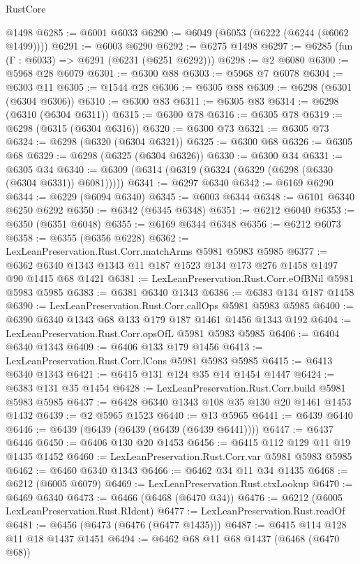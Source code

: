 \begin{lexlean}{RustCore}
\begin{coremodule}
{\begin{coremodule}
{{{{{{{{{{{{{{{{{{{{{{{{{{{{{{{{{{{{{{{{{{{{{{{    @1498
@6285 := @6001 @6033
@6290 := @6049 (@6053 (@6222 (@6244 (@6062 @1499))))
@6291 := @6003 @6290
@6292 := @6275 @1498
@6297 := @6285 (fun (Γ : @6033) => @6291 (@6231 (@6251 @6292)))
@6298 := @2 @6080
@6300 := @5968 @28 @6079
@6301 := @6300 @88
@6303 := @5968 @7 @6078
@6304 := @6303 @11
@6305 := @1544 @28
@6306 := @6305 @88
@6309 := @6298 (@6301 (@6304 @6306))
@6310 := @6300 @83
@6311 := @6305 @83
@6314 := @6298 (@6310 (@6304 @6311))
@6315 := @6300 @78
@6316 := @6305 @78
@6319 := @6298 (@6315 (@6304 @6316))
@6320 := @6300 @73
@6321 := @6305 @73
@6324 := @6298 (@6320 (@6304 @6321))
@6325 := @6300 @68
@6326 := @6305 @68
@6329 := @6298 (@6325 (@6304 @6326))
@6330 := @6300 @34
@6331 := @6305 @34
@6340 := @6309 (@6314 (@6319 (@6324 (@6329 (@6298 (@6330 (@6304 @6331)) @6081)))))
@6341 := @6297 @6340
@6342 := @6169 @6290
@6344 := @6229 (@6094 @6340)
@6345 := @6003 @6344
@6348 := @6101 @6340 @6250 @6292
@6350 := @6342 (@6345 @6348)
@6351 := @6212 @6040
@6353 := @6350 (@6351 @6048)
@6355 := @6169 @6344 @6348
@6356 := @6212 @6073
@6358 := @6355 (@6356 @6228)
@6362 := LexLeanPreservation.Rust.Corr.matchArms @5981 @5983 @5985
@6377 := @6362 @6340 @1343 @1343 @11 @187 @1523 @134 @173 @276 @1458 @1497 @90 @1415 @68 @1421
@6381 := LexLeanPreservation.Rust.Corr.eOfBNil @5981 @5983 @5985
@6383 := @6381 @6340 @1343
@6386 := @6383 @134 @187 @1458
@6390 := LexLeanPreservation.Rust.Corr.callOps @5981 @5983 @5985
@6400 := @6390 @6340 @1343 @68 @133 @179 @187 @1461 @1456 @1343 @192
@6404 := LexLeanPreservation.Rust.Corr.opsOfL @5981 @5983 @5985
@6406 := @6404 @6340 @1343
@6409 := @6406 @133 @179 @1456
@6413 := LexLeanPreservation.Rust.Corr.lCons @5981 @5983 @5985
@6415 := @6413 @6340 @1343
@6421 := @6415 @131 @124 @35 @14 @1454 @1447
@6424 := @6383 @131 @35 @1454
@6428 := LexLeanPreservation.Rust.Corr.build @5981 @5983 @5985
@6437 := @6428 @6340 @1343 @108 @35 @130 @20 @1461 @1453 @1432
@6439 := @2 @5965 @1523
@6440 := @13 @5965
@6441 := @6439 @6440
@6446 := @6439 (@6439 (@6439 (@6439 (@6439 @6441))))
@6447 := @6437 @6446
@6450 := @6406 @130 @20 @1453
@6456 := @6415 @112 @129 @11 @19 @1435 @1452
@6460 := LexLeanPreservation.Rust.Corr.var @5981 @5983 @5985
@6462 := @6460 @6340 @1343
@6466 := @6462 @34 @11 @34 @1435
@6468 := @6212 (@6005 @6079)
@6469 := LexLeanPreservation.Rust.ctxLookup
@6470 := @6469 @6340
@6473 := @6466 (@6468 (@6470 @34))
@6476 := @6212 (@6005 LexLeanPreservation.Rust.RIdent)
@6477 := LexLeanPreservation.Rust.readOf
@6481 := @6456 (@6473 (@6476 (@6477 @1435)))
@6487 := @6415 @114 @128 @11 @18 @1437 @1451
@6494 := @6462 @68 @11 @68 @1437 (@6468 (@6470 @68))
}}}}}}}}}}}}}}}}}}}}}}}}}}}}}}}}}}}}}}}}}}}}}}}
\end{coremodule}}
\end{coremodule}
\end{lexlean}

